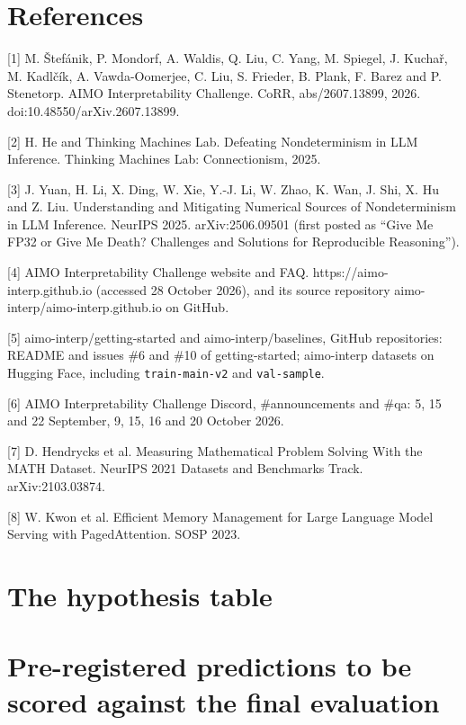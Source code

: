 \documentclass{article}
\begin{document}
\section*{References}
{\small
[1] M. Štefánik, P. Mondorf, A. Waldis, Q. Liu, C. Yang, M. Spiegel, J. Kuchař, M. Kadlčík, A. Vawda-Oomerjee, C. Liu, S. Frieder, B. Plank, F. Barez and P. Stenetorp. AIMO Interpretability Challenge. CoRR, abs/2607.13899, 2026. doi:10.48550/arXiv.2607.13899.

[2] H. He and Thinking Machines Lab. Defeating Nondeterminism in LLM Inference. Thinking Machines Lab: Connectionism, 2025.

[3] J. Yuan, H. Li, X. Ding, W. Xie, Y.-J. Li, W. Zhao, K. Wan, J. Shi, X. Hu and Z. Liu. Understanding and Mitigating Numerical Sources of Nondeterminism in LLM Inference. NeurIPS 2025. arXiv:2506.09501 (first posted as ``Give Me FP32 or Give Me Death? Challenges and Solutions for Reproducible Reasoning'').

[4] AIMO Interpretability Challenge website and FAQ. https://aimo-interp.github.io (accessed 28 October 2026), and its source repository aimo-interp/aimo-interp.github.io on GitHub.

[5] aimo-interp/getting-started and aimo-interp/baselines, GitHub repositories: README and issues \#6 and \#10 of getting-started; aimo-interp datasets on Hugging Face, including \texttt{train-main-v2} and \texttt{val-sample}.

[6] AIMO Interpretability Challenge Discord, \#announcements and \#qa: 5, 15 and 22 September, 9, 15, 16 and 20 October 2026.

[7] D. Hendrycks et al. Measuring Mathematical Problem Solving With the MATH Dataset. NeurIPS 2021 Datasets and Benchmarks Track. arXiv:2103.03874.

[8] W. Kwon et al. Efficient Memory Management for Large Language Model Serving with PagedAttention. SOSP 2023.
}

\clearpage
\appendix
\raggedright

\section{The hypothesis table}\label{app:A}



\section{Pre-registered predictions to be scored against the final evaluation}\label{app:B}
\end{document}
